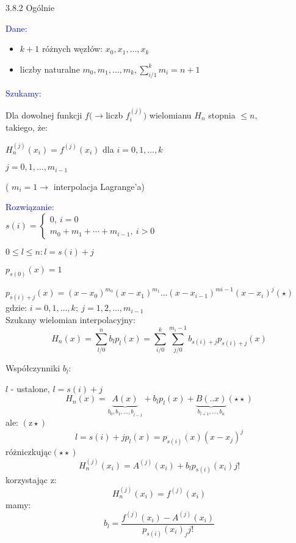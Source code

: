 \begin{frame}
{3.8.2 Ogólnie}

\textcolor{blue}{Dane:}
\begin{itemize}
\item $k+1$ różnych węzłów: $x_{0}, x_{1}, \dots, x_{k}$

\item liczby naturalne $m_{0}, m_{1},\dots , m_{k}, \displaystyle \sum_{i/1}^{k}m_{i}=n+1$
\end{itemize}
\textcolor{blue}{Szukamy:}

Dla dowolnej funkcji $ f(\rightarrow$liczb {\it $f_{i}^{(j)}$}$)$ wielomianu $H_{n}$ stopnia $\leq n,$ \\
takiego, że:

$H_{n}^{(j)}(x_{i})=f^{(j)}(x_{i})$ \quad dla $i=0, 1, \dots , k$
\begin{center}
$j=0, 1, \dots, m_{i-1}$
\end{center}
( $m_{i}=1\rightarrow$ interpolacja Lagrange'a)
\end{frame}

\begin{frame}
\textcolor{blue}{Rozwiązanie:} \\
\vspace{2mm}
$s(i)=\left\{\begin{array}{l}
0,\ i=0\\
m_{0}+m_{1}+\cdots+m_{i-1},\ i>0
\end{array}\right.$
\vspace{2mm}

$0\leq l\leq n:l=s(i)+j$

$p_{s(0)}(x)=1$

$p_{s(i)+j}(x)=(x-x_{0})^{m_{0}}(x-x_{1})^{m_{1}}\ldots(x-x_{i-1})^{mi-1}(x-x_{i})^{j}(\star)$ \\
gdzie: $i=0, 1, \dots, k; \: j=1, 2, \dots , m_{i-1}$ \\
\vspace{3mm}
Szukany wielomian interpolacyjny:
$$
H_{n}(x)=\sum_{l/0}^{n}b_{l}p_{l}(x)=\sum_{i/0}^{k}\sum_{j/0}^{m_i-1}b_{s(i)+j}p_{s(i)+j}(x)
$$
\end{frame}

\begin{frame}
Współczynniki $b_{l}$:


$l$ - ustalone, $l=s(i)+j$
$$
H_{n}(x)=\underbrace{A(x)}_{b_{0},{b_{1},\ldots,b}_{l-1}}+b_{l}p_{l}(x)+\underbrace{B(..x)}_{b_{l+1},\ldots,b_{n}}(\star\star)
$$
ale: $(\mathrm{z}\star)$
$$
l=s(i)+jp_{l}(x)=p_{s(i)}(x)(x-x_{j})^{j}
$$
$
$różniczkując$(\star\star)
$
$$
H_{n}^{(j)}(x_{i})=A^{(j)}(x_{i})+b_{l}p_{s(i)}(x_{i})j!
$$
korzystając $\mathrm{z}$:
$$
H_{n}^{(j)}(x_{i})=f^{(j)}(x_{i})
$$
mamy:
$$
b_{l}=\frac{f^{(j)}(x_{i})-A^{(j)}(x_{i})}{p_{s(i)}(x_{i})_{j}j!}
$$

\end{frame}
